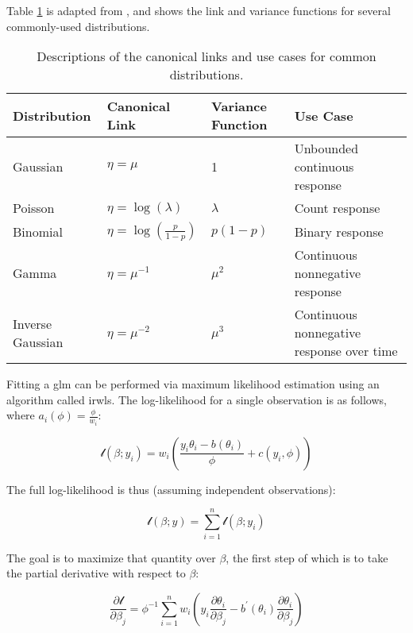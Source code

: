 \documentclass{report}
\begin{document}
Table \ref{table:links} is adapted from \cite[Chapter~8.1-2]{faraway_extending_2016}, and shows the link and variance functions for several commonly-used distributions.  

\begin{table}[h!]
\centering
\begin{tabular}{||l l l l||} 
 \hline
 \textbf{Distribution} & \textbf{Canonical Link} & \textbf{Variance Function} & \textbf{Use Case} \\ [0.5ex] 
  \hline\hline
  Gaussian & $\eta = \mu$ & 1 & Unbounded continuous response \\ 
  \hline
  Poisson & $\eta = \log(\lambda)$ & $\lambda$ & Count response \\
  \hline
  Binomial & $\eta = \log\left(\frac{p}{1-p}\right)$ & $p(1-p)$ & Binary response \\
  \hline 
  Gamma & $\eta = \mu^{-1}$ & $\mu^2$ & Continuous nonnegative response \\
  \hline
  Inverse Gaussian & $\eta = \mu^{-2}$ & $\mu^3$ & Continuous nonnegative response over time \\ 
  \hline
\end{tabular}
\caption{Descriptions of the canonical links and use cases for common distributions.}
\label{table:links}
\end{table}

Fitting a \gls{glm} can be performed via maximum likelihood estimation using an algorithm called \gls{irwls}. The log-likelihood for a single observation is as follows, where $a_i(\phi) = \frac{\phi}{w_i}$:

\begin{equation}\label{eq:glm-loglik-individual}
    \mathcal{l}(\beta; y_i) = w_i \left(\frac{y_i\theta_i - b(\theta_i)}{\phi} + c(y_i, \phi)\right)
\end{equation}

The full log-likelihood is thus (assuming independent observations):

\begin{equation}\label{eq:glm-loglik-full}
    \mathcal{l}(\beta; y) = \sum_{i=1}^n \mathcal{l}(\beta; y_i)
\end{equation}

The goal is to maximize that quantity over $\beta$, the first step of which is to take the partial derivative with respect to $\beta$:

\begin{equation}\label{eq:glm-score-equation-1}
    \frac{\partial\mathcal{l}}{\partial\beta_j} = \phi^{-1} \sum_{i=1}^n w_i \left(y_i\frac{\partial\theta_i}{\partial\beta_j} - b^\prime(\theta_i)\frac{\partial\theta_i}{\partial\beta_j}\right)
\end{equation}
\end{document}
